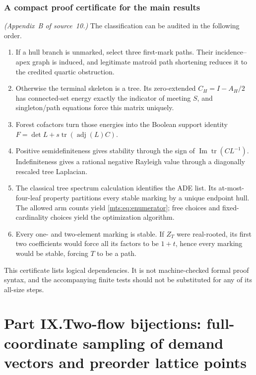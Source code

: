 \documentclass[11pt]{article}
\numberwithin{equation}{section}
\theoremstyle{definition}
\newcommand{\adj}{\operatorname{adj}}
\newcommand{\tr}{\operatorname{tr}}
\newcommand{\im}{\operatorname{Im}}
\begin{document}
\section{A compact proof certificate for the main results}
\label{mts:app:certificate}

\noindent\emph{(Appendix~B of source~10.)}
The classification can be audited in the following order.
\begin{enumerate}
\item If a hull branch is unmarked, select three first-mark paths. Their
incidence--apex graph is induced, and legitimate matroid path shortening
reduces it to the credited quartic obstruction.
\item Otherwise the terminal skeleton is a tree. Its zero-extended
$C_H=I-A_H/2$ has connected-set energy exactly the indicator of meeting
$S$, and singleton/path equations force this matrix uniquely.
\item Forest cofactors turn those energies into the Boolean support
identity $F=\det L+s\tr(\adj(L)C)$.
\item Positive semidefiniteness gives stability through the sign of
$\im\tr(CL^{-1})$. Indefiniteness gives a rational negative Rayleigh
value through a diagonally rescaled tree Laplacian.
\item The classical tree spectrum calculation identifies the ADE list.
Its at-most-four-leaf property partitions every stable marking by a unique
endpoint hull. The allowed arm counts yield \eqref{mts:eq:enumerator}; free
choices and fixed-cardinality choices yield the optimization algorithm.
\item Every one- and two-element marking is stable. If $Z_T$ were
real-rooted, its first two coefficients would force all its factors to be
$1+t$, hence every marking would be stable, forcing $T$ to be a path.
\end{enumerate}

This certificate lists logical dependencies. It is not machine-checked
formal proof syntax, and the accompanying finite tests should not be
substituted for any of its all-size steps.


\clearpage
{}\part*{Part IX.\quad Two-flow bijections: full-coordinate sampling of demand vectors and preorder lattice points}
\end{document}
